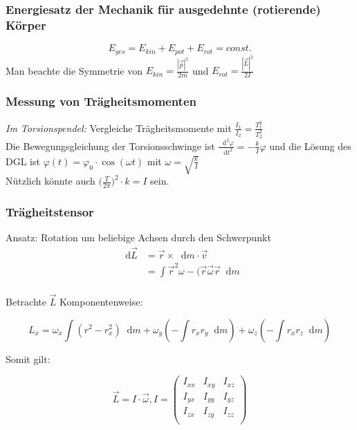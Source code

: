 \documentclass[a4paper,12pt]{report}
\newcommand*\diff{\mathop{}\!\mathrm{d}}
\begin{document}
\subsubsection{Energiesatz der Mechanik für ausgedehnte (rotierende) Körper}
\begin{equation}
E_{ges} = E_{kin} + E_{pot} + E_{rot} = const.
\end{equation}
Man beachte die Symmetrie von $E_{kin} = \frac{|\vec{p}|^2}{2m} $ und $ E_{rot} = \frac{|\vec{L}|^2}{2 I} $ \\

\subsubsection{Messung von Trägheitsmomenten}

\emph{Im Torsionspendel:} Vergleiche Trägheitsmomente mit $ \frac{I_1}{I_2} = \frac{T_1^2}{T_2^2} $ \\

Die Bewegungsgleichung der Torsionsschwinge ist $\frac{ \diff ^2 \varphi}{\diff t ^2} = -\frac{k}{I} \varphi $ und die Lösung des DGL ist $ \varphi(t) = \varphi_0 \cdot \cos(\omega t ) $ mit $ \omega = \sqrt{\frac{k}{I} }$ \\

Nützlich könnte auch $ \bigl(\frac{T}{2\pi}\bigr)^2 \cdot k = I $ sein. 


\subsubsection{Trägheitstensor}


Ansatz: Rotation um beliebige Achsen durch den Schwerpunkt \\
\begin{align*}
\diff \vec{L} &= \vec{r} \times \diff m \cdot \vec{v} \\
&= \int \vec{r}^2 \omega - (\vec{r} \vec{\omega} \vec{r} \diff m \\
\end{align*}

Betrachte $\vec{L}$ Komponentenweise:

\begin{equation*}
L_x = \omega_x \int (r^2-r_x^2) \diff m + \omega_y (-\int r_x r_y \diff m) + \omega_z(- \int r_x r_z \diff m)
\end{equation*}

Somit gilt:

\begin{equation}
\vec{L} = I \cdot \vec{\omega},   I = 
\begin{pmatrix}
I_{xx} & I_{xy} & I_{xz} \\
I_{yx} & I_{yy} & I_{yz} \\
I_{zx} & I_{zy} & I_{zz} \\
\end{pmatrix}
\end{equation}
\end{document}
